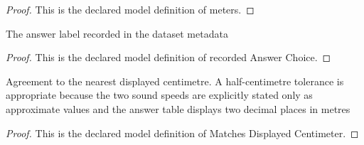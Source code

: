 \begin{proof}
  This is the declared model definition of meters.
\end{proof}
\begin{definition}
  \label{def:physics:phyx-mini-0209:phyxminiproblems-problemphyxmini0209-recordedanswerchoice}
  The answer label recorded in the dataset metadata
\end{definition}
\begin{proof}
  This is the declared model definition of recorded Answer Choice.
\end{proof}
\begin{definition}
  \label{def:physics:phyx-mini-0209:phyxminiproblems-problemphyxmini0209-matchesdisplayedcentimeter}
  Agreement to the nearest displayed centimetre. A half-centimetre tolerance is appropriate because the two sound speeds are explicitly stated only as approximate values and the answer table displays two decimal places in metres
\end{definition}
\begin{proof}
  This is the declared model definition of Matches Displayed Centimeter.
\end{proof}
